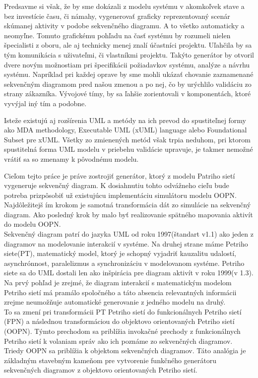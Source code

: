 Predsavme si však, že by sme dokázali z modelu systému v akomkoľvek stave a bez investície času, či námahy, vygenerovať graficky reprezentovaný scenár skúmanej aktivity v podobe sekvenčného diagramu. A to všetko automaticky a neomyľne. Tomuto grafickému pohľadu na časť systému by rozumeli nielen špecialisti z oboru, ale aj technicky menej znalí účastníci projektu. Uľahčila by sa tým komunikácia s uživateľmi, či vlastníkmi projektu. Takýto generátor by otvoril dvere novým možnostiam pri špecifikácii požiadavkov systému, analýze a návrhu systému. Napríklad pri každej oprave by sme mohli ukázať chovanie zaznamenané sekvenčným diagramom pred našou zmenou a po nej, čo by urýchlilo validáciu zo strany zákazníka. Vývojové tímy, by sa ľahšie zorientovali v komponentách, ktoré vyvýjal iný tím a podobne.

 Isteže existujú aj rozšírenia UML a metódy na ich prevod do spustiteľnej formy ako MDA methodology, Executable UML (xUML) language alebo Foundational Subset pre xUML. Všetky zo zmienených metód však trpia neduhom, pri ktorom spustitelná forma UML modelu v priebehu validácie upravuje, je takmer nemožné vrátiť sa so zmenamy k pôvodnému modelu. 

Cieľom tejto práce je práve zostrojiť generátor, ktorý z modelu Patriho sietí vygeneruje sekvenčný diagram. K dosiahnutiu tohto odvážneho cieľu bude potreba prizpôsobiť už existujúcu implementáciu simulátoru modelu OOPN. Najdôležitejš ím  krokom je samotná transformácia dát zo simulácie na sekvenčný diagram. Ako posledný krok by malo byť realizovanie spätného mapovania aktivít do modelu OOPN. \\

Sekvenčný diagram patrí do jazyka UML od roku 1997(štandart v1.1) ako jeden z diagramov na modelovanie interakcií v systéme. Na druhej strane máme Petriho siete(PT), matematický model, ktorý je schopný vyjadriť kauzalitu udalostí, asynchrónnost, paralelizmus a synchronizáciu v modelovanom systéme. Petriho siete sa do UML dostali len ako inšpirácia pre diagram aktivít v roku 1999(v 1.3). Na prvý pohľad je zrejmé, že diagram interakcií s matematickým modelom Petriho sietí má pramálo spoločného a táto absencia relevantných informácii zrejme neumožňuje automatické generovanie z jedného modelu na druhý. \\

To sa zmení pri transformácii PT Petriho sietí do  funkcionálnych Petriho sietí (FPN) a následnou transformáciou do objektovo orientovaných Petriho sietí (OOPN). Týmto prechodom sa priblížia invokačné prechody z funkcionálnych Petriho sietí k volaniam správ ako ich poznáme zo sekvenčných diagramov. Triedy OOPN sa priblížia k objektom sekvenčných diagramov. Táto analógia je základným stavebným kameňom pre vytvorenie funkčného generátoru sekvenčných diagramov z objektovo orientovaných Petriho sietí.



